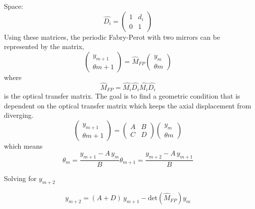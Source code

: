 \begin{appendices}
	Space:
	\begin{equation} \label{space}
	\hat{D_i} = 
	\begin{pmatrix}
		1	& d_i		
	\\ 	0	&1
	\end{pmatrix}
	\end{equation}
	Using these matrices, the periodic Fabry-Perot with two mirrors can be represented by the matrix,
	\begin{equation}
	\begin{pmatrix} y_{m+1} 
	\\ \theta{m+1}
	\end{pmatrix}
	= \hat{M}_{FP} \begin{pmatrix} y_{m} 
	\\ \theta{m}
	\end{pmatrix}
	\end{equation}
	where 
	\begin{equation}
	\hat{M}_{FP} = \hat{M_i} \hat{D_i} \hat{M_i} \hat{D_i}
	\end{equation}
	is the optical transfer matrix.  The goal is to find a geometric condition that is dependent on the optical transfer matrix which keeps the axial displacement from diverging.
	\begin{equation}
	\begin{pmatrix} y_{m+1} 
	\\ \theta{m+1}
	\end{pmatrix}
	= 
	\begin{pmatrix}
		A	&B		
	\\ 	C	&D
	\end{pmatrix}
	\begin{pmatrix} y_{m} 
	\\ \theta{m}
	\end{pmatrix}
	\end{equation}
	which means
	\begin{subequations}
	\begin{equation}
	\theta_m = \frac{y_{m+1} - A \, y_m}{B}
	\end{equation}
	\begin{equation}
	\theta_{m+1} = \frac{y_{m+2} - A \, y_{m+1}}{B}
	\end{equation}
	\end{subequations}

	Solving for $y_{m+2}$
	
	\begin{equation}
	y_{m+2} = (A+D) \, y_{m+1} - \text{det}(\hat{M}_{FP}) y_m
	\end{equation}
	

\end{appendices}
